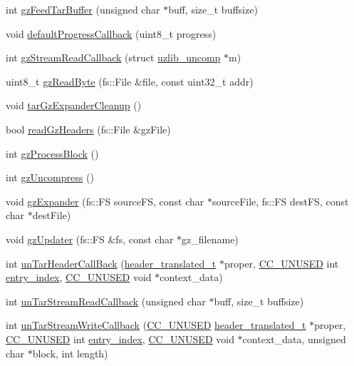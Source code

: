 \begin{DoxyCompactItemize}
\item 
int \hyperlink{ESP32-targz_8cpp_a76a1b14c3542e7fadf15e7c08355534a}{gz\+Feed\+Tar\+Buffer} (unsigned char $\ast$buff, size\+\_\+t buffsize)
\item 
void \hyperlink{ESP32-targz_8cpp_a140daab0ca33c2558bcc4f856c3dd1bd}{default\+Progress\+Callback} (uint8\+\_\+t progress)
\item 
int \hyperlink{ESP32-targz_8cpp_af2f4baef1eb72f4aae11df0287c913af}{gz\+Stream\+Read\+Callback} (struct \hyperlink{structuzlib__uncomp}{uzlib\+\_\+uncomp} $\ast$m)
\item 
uint8\+\_\+t \hyperlink{ESP32-targz_8cpp_ae2562ae5f7d7f41edd04ba586b0cfec9}{gz\+Read\+Byte} (fs\+::\+File \&file, const uint32\+\_\+t addr)
\item 
void \hyperlink{ESP32-targz_8cpp_abdcef0bceec9696afa93203b2820be4d}{tar\+Gz\+Expander\+Cleanup} ()
\item 
bool \hyperlink{ESP32-targz_8cpp_a05b8ccb59a181088df4b2f9d3242462b}{read\+Gz\+Headers} (fs\+::\+File \&gz\+File)
\item 
int \hyperlink{ESP32-targz_8cpp_a5e34d11e283ba6a157df28d23c2a0b44}{gz\+Process\+Block} ()
\item 
int \hyperlink{ESP32-targz_8cpp_a018f5c86f4f5d51609f85183e46f92d6}{gz\+Uncompress} ()
\item 
void \hyperlink{ESP32-targz_8cpp_acddb3fa5de990d7b1c38b3a9e051c81a}{gz\+Expander} (fs\+::\+FS source\+FS, const char $\ast$source\+File, fs\+::\+FS dest\+FS, const char $\ast$dest\+File)
\item 
void \hyperlink{ESP32-targz_8cpp_a950aaa5d8797a35db9aea94e2a669fc0}{gz\+Updater} (fs\+::\+FS \&fs, const char $\ast$gz\+\_\+filename)
\item 
int \hyperlink{ESP32-targz_8cpp_a902ca38dc2cff4f4893bd1dbd6fb301f}{un\+Tar\+Header\+Call\+Back} (\hyperlink{untar_8h_a9147d454aea305f52e7b97b50ed26918}{header\+\_\+translated\+\_\+t} $\ast$proper, \hyperlink{ESP32-targz_8cpp_a88f6b33e1b3dd06a431809c0b41fccfa}{C\+C\+\_\+\+U\+N\+U\+S\+ED} int \hyperlink{untar_8c_a36e3b8f9d08679a7381caa6c15ea9888}{entry\+\_\+index}, \hyperlink{ESP32-targz_8cpp_a88f6b33e1b3dd06a431809c0b41fccfa}{C\+C\+\_\+\+U\+N\+U\+S\+ED} void $\ast$context\+\_\+data)
\item 
int \hyperlink{ESP32-targz_8cpp_accbbe30121cc94e268e797bf4c555c34}{un\+Tar\+Stream\+Read\+Callback} (unsigned char $\ast$buff, size\+\_\+t buffsize)
\item 
int \hyperlink{ESP32-targz_8cpp_a9f9a546b557c0f1165a9050f54bec630}{un\+Tar\+Stream\+Write\+Callback} (\hyperlink{ESP32-targz_8cpp_a88f6b33e1b3dd06a431809c0b41fccfa}{C\+C\+\_\+\+U\+N\+U\+S\+ED} \hyperlink{untar_8h_a9147d454aea305f52e7b97b50ed26918}{header\+\_\+translated\+\_\+t} $\ast$proper, \hyperlink{ESP32-targz_8cpp_a88f6b33e1b3dd06a431809c0b41fccfa}{C\+C\+\_\+\+U\+N\+U\+S\+ED} int \hyperlink{untar_8c_a36e3b8f9d08679a7381caa6c15ea9888}{entry\+\_\+index}, \hyperlink{ESP32-targz_8cpp_a88f6b33e1b3dd06a431809c0b41fccfa}{C\+C\+\_\+\+U\+N\+U\+S\+ED} void $\ast$context\+\_\+data, unsigned char $\ast$block, int length)

\end{DoxyCompactItemize}
